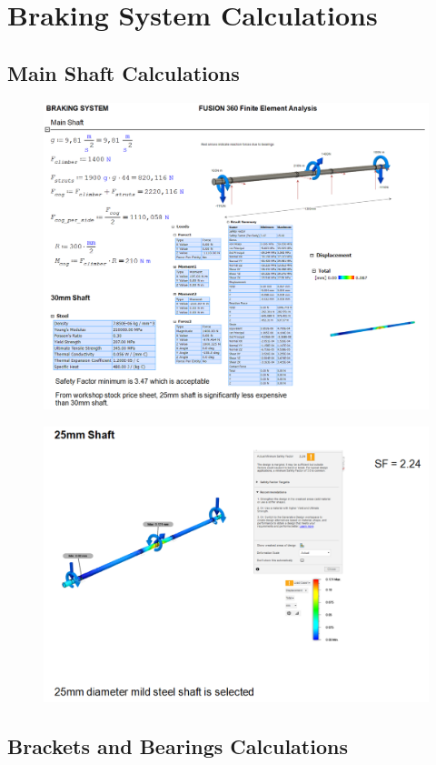 \chapter{Braking System Calculations}
\label{appx:braking-calcs}

\section{Main Shaft Calculations}
\label{calcs:main_braking_shaft}

\begin{figure}[H]
    \centering
    \includegraphics[width=0.9\linewidth]{chaps-append/calcs/main_shaft_calcs1.png}
\end{figure}

\begin{figure}[H]
    \centering
    \includegraphics[width=0.7\linewidth]{chaps-append/calcs/main_shaft_calcs_2.png}
\end{figure}

\section{Brackets and Bearings Calculations}
\label{calcs:brackets_bearings}

